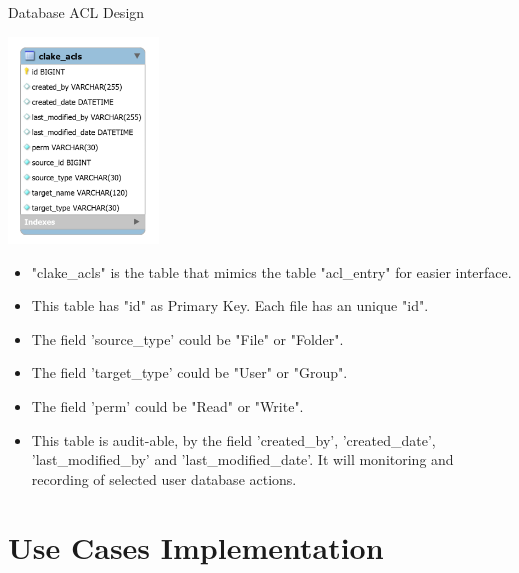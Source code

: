 \begin{table}[H]
  \centering
  \caption{Database ACL Design}
  \label{tbl:dbACL}
  \includegraphics[width=0.3\textwidth]{images/DatabaseAclDesign.PNG}
\end{table}
\begin{itemize}
    \item "clake\_acls" is the table that mimics the table "acl\_entry" for easier interface.
    \item This table has "id" as Primary Key. Each file has an unique "id".
    \item The field 'source\_type' could be "File" or "Folder".
    \item The field 'target\_type' could be "User" or "Group". 
    \item The field 'perm' could be "Read" or "Write". 
    \item This table is audit-able, by the field 'created\_by', 'created\_date', 'last\_modified\_by' and 'last\_modified\_date'. It will monitoring and recording of selected user database actions.
\end{itemize}
\section{Use Cases Implementation}
